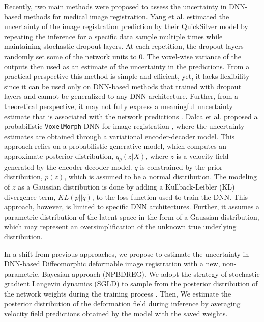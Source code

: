 \documentclass[preprint,authoryear]{elsarticle}
\begin{document}
Recently, two main methods were proposed to assess the uncertainty in DNN-based methods for medical image registration. Yang et al. \cite{yang2017quicksilver} estimated the uncertainty of the image registration prediction by their QuickSilver model by repeating the inference for a specific data sample multiple times while maintaining stochastic dropout layers. At each repetition, the dropout layers randomly set some of the network units to $0$. The voxel-wise variance of the outputs then used as an estimate of the uncertainty in the predictions. From a practical perspective this method is simple and efficient, yet, it lacks flexibility since it can be used only on DNN-based methods that trained with dropout layers and cannot be generalized to any DNN architecture. Further, from a theoretical perspective, it may not fully express a meaningful uncertainty estimate that is associated with the network predictions \cite{jospin2020hands,osband2016deep}. %
Dalca et al. proposed a probabilistic \texttt{VoxelMorph} DNN for image registration \cite{dalca2018varreg,dalca2019varreg}, where the uncertainty estimates are obtained through a variational encoder-decoder model. This approach relies on a probabilistic generative model, which computes an approximate posterior distribution, $q_\theta(z|X)$, where $z$ is a velocity field generated by the encoder-decoder model. $q$ is constrained by the prior distribution, $p(z)$, which is assumed to be a normal distribution. The modeling of $z$  as a Gaussian distribution is done by adding a Kullback-Leibler (KL) divergence term, $ KL(p||q)$, to the loss function used to train the DNN.
This approach, however, is limited to specific DNN architectures. Further, it assumes a parametric distribution of the latent space in the form of a Gaussian distribution, which may represent an oversimplification of the unknown true underlying distribution. 

In a shift from previous approaches, we propose to estimate the uncertainty in DNN-based Diffeomorphic deformable image registration with a new, non-parametric, Bayesian approach (NPBDREG). We adopt the strategy of stochastic gradient Langevin dynamics (SGLD) \cite{welling2011bayesian} to sample from the posterior distribution of the network weights during the training process \cite{cheng2019bayesian}. Then, We estimate the posterior distribution of the deformation field during inference by averaging velocity field predictions obtained by the model with the saved weights. 
\end{document}
